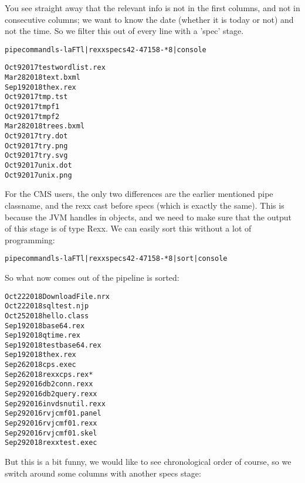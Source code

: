 You see straight away that the relevant info is not in the first columns, and not in consecutive columns; we want to know the date (whether it is today or not) and not the time. So we filter this out of every line with a 'spec' stage.
\begin{alltt}
pipe command ls -laFTl | rexx specs 42-47 1 58-* 8 | console
\end{alltt}
\begin{alltt}
Oct 9 2017 testwordlist.rex
Mar 28 2018 text.bxml
Sep 19 2018 thex.rex
Oct 9 2017 tmp.tst
Oct 9 2017 tmpf1
Oct 9 2017 tmpf2
Mar 28 2018 trees.bxml
Oct 9 2017 try.dot
Oct 9 2017 try.png
Oct 9 2017 try.svg
Oct 9 2017 unix.dot
Oct 9 2017 unix.png
\end{alltt}
For the CMS users, the only two differences are the earlier mentioned pipe classname, and the rexx cast before specs (which is exactly the same). This is because the JVM handles in objects, and we need to make sure that the output of this stage is of type Rexx. 
We can easily sort this without a lot of programming:

\begin{alltt}
pipe command ls -laFTl | rexx specs 42-47 1 58-* 8 | sort | console
\end{alltt}
So what now comes out of the pipeline is sorted:
\begin{alltt}
Oct 22 2018 DownloadFile.nrx
Oct 22 2018 sqltest.njp
Oct 25 2018 hello.class
Sep 19 2018 base64.rex
Sep 19 2018 qtime.rex
Sep 19 2018 testbase64.rex
Sep 19 2018 thex.rex
Sep 26 2018 cps.exec
Sep 26 2018 rexxcps.rex*
Sep 29 2016 db2conn.rexx
Sep 29 2016 db2query.rexx
Sep 29 2016 invdsnutil.rexx
Sep 29 2016 rvjcmf01.panel
Sep 29 2016 rvjcmf01.rexx
Sep 29 2016 rvjcmf01.skel
Sep 29 2018 rexxtest.exec
\end{alltt}
But this is a bit funny, we would like to see chronological order of course, so we switch around some columns with another specs stage:

